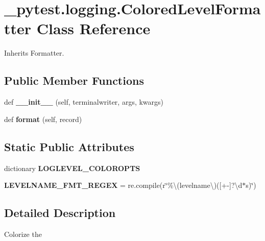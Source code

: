 \hypertarget{class__pytest_1_1logging_1_1_colored_level_formatter}{}\section{\+\_\+pytest.\+logging.\+Colored\+Level\+Formatter Class Reference}
\label{class__pytest_1_1logging_1_1_colored_level_formatter}


Inherits Formatter.

\subsection*{Public Member Functions}
\begin{DoxyCompactItemize}
\item 
\mbox{\label{class__pytest_1_1logging_1_1_colored_level_formatter_adb00462988b5fd3e051a32126f112c92}} 
def {\bfseries \+\_\+\+\_\+init\+\_\+\+\_\+} (self, terminalwriter, args, kwargs)
\item 
\mbox{\label{class__pytest_1_1logging_1_1_colored_level_formatter_aa80f818609ef0e43b9b6a1c854820f00}} 
def {\bfseries format} (self, record)
\end{DoxyCompactItemize}
\subsection*{Static Public Attributes}
\begin{DoxyCompactItemize}
\item 
dictionary {\bfseries L\+O\+G\+L\+E\+V\+E\+L\+\_\+\+C\+O\+L\+O\+R\+O\+P\+TS}
\item 
\mbox{\label{class__pytest_1_1logging_1_1_colored_level_formatter_a2c8f52256ca28158e9152fb64b9a5f12}} 
{\bfseries L\+E\+V\+E\+L\+N\+A\+M\+E\+\_\+\+F\+M\+T\+\_\+\+R\+E\+G\+EX} = re.\+compile(r\char`\"{}\%\textbackslash{}(levelname\textbackslash{})(\mbox{[}+-\/\mbox{]}?\textbackslash{}d$\ast$s)\char`\"{})
\end{DoxyCompactItemize}


\subsection{Detailed Description}
\begin{DoxyVerb}Colorize the %
\end{DoxyVerb}
 

